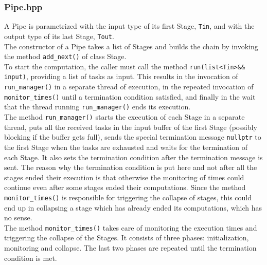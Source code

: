 \documentclass[12pt]{article}
\begin{document}
\subsubsection{Pipe.hpp}
A Pipe is parametrized with the input type of its first Stage, \texttt{Tin}, and with the output type of its last Stage, \texttt{Tout}. \\
The constructor of a Pipe takes a list of Stages and builds the chain by invoking the method \texttt{add\_next()} of class Stage. \\
To start the computation, the caller must call the method \texttt{run(list<Tin>\&\& input)}, providing a list of tasks as input. This results in the invocation of \texttt{run\_manager()} in a separate thread of execution, in the repeated invocation of \texttt{monitor\_times()} until a termination condition satisfied, and finally in the wait that the thread running \texttt{run\_manager()} ends its execution. \\
The method \texttt{run\_manager()} starts the execution of each Stage in a separate thread, puts all the received tasks in the input buffer of the first Stage (possibly blocking if the buffer gets full), sends the special termination message \texttt{nullptr} to the first Stage when the tasks are exhausted and waits for the termination of each Stage. It also sets the termination condition after the termination message is sent. The reason why the termination condition is put here and not after all the stages ended their execution is that otherwise the monitoring of times could continue even after some stages ended their computations. Since the method \texttt{monitor\_times()} is responsible for triggering the collapse of stages, this could end up in collapsing a stage which has already ended its computations, which has no sense. \\
The method \texttt{monitor\_times()} takes care of monitoring the execution times and triggering the collapse of the Stages. It consists of three phases: initialization, monitoring and collapse. The last two phases are repeated until the termination condition is met.
\end{document}
